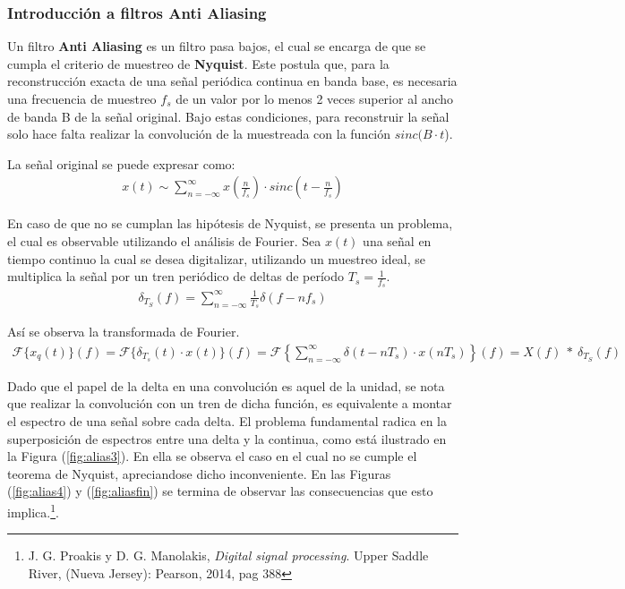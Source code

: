 \subsubsection{Introducción a filtros Anti Aliasing}
Un filtro \textbf{Anti Aliasing} es un filtro pasa bajos, el cual se encarga de que se cumpla el criterio de muestreo de \textbf{Nyquist}. Este postula que, para la reconstrucción exacta de una señal periódica continua en banda base, es necesaria una frecuencia de muestreo $f_s$ de un valor por lo menos 2 veces superior al ancho de banda B de la señal original. Bajo estas condiciones, para reconstruir la señal solo hace falta realizar la convolución de la muestreada con la función $sinc(B\cdot t$).

La señal original se puede expresar como:
\begin{align}
	x\left( t \right) \sim \sum_{n=-\infty}^{\infty} x\left( \frac{n}{f_s} \right) \cdot sinc \left( t-\frac{n}{f_s} \right)
\end{align}

En caso de que no se cumplan las hipótesis de Nyquist, se presenta un problema, el cual es observable utilizando el análisis de Fourier. Sea $x(t)$ una señal en tiempo continuo la cual se desea digitalizar, utilizando un muestreo ideal, se multiplica la señal por un tren periódico de deltas de período $T_s = \frac{1}{f_s}$.
\begin{align}
\delta_{T_S}(f)= \sum_{n=-\infty}^{\infty} \frac{1}{T_s} \delta(f-nf_s)
\end{align}

Así se observa la transformada de Fourier.
\begin{align}
	\mathcal{F} \{x_q(t) \} (f) =\mathcal{F} \{ \delta_{T_s} (t) \cdot x(t) \} (f)=\mathcal{F} \left\lbrace \sum_{n=-\infty}^{\infty} \delta(t-nT_s) \cdot x(nT_s)\right\rbrace (f)= X(f)\  *  \ \delta_{T_S}(f)
\end{align}

Dado que el papel de la delta en una convolución es aquel de la unidad, se nota que realizar la convolución con un tren de dicha función, es equivalente a montar el espectro de una señal sobre cada delta. El problema fundamental radica en la superposición de espectros entre una delta y la continua, como está ilustrado en la Figura (\ref{fig:alias3}). En ella se observa el caso en el cual no se cumple el teorema de Nyquist, apreciandose dicho inconveniente. En las Figuras (\ref{fig:alias4}) y (\ref{fig:aliasfin}) se termina de observar las consecuencias que esto implica.\footnote{J. G. Proakis y D. G. Manolakis, \textit{Digital signal processing}. Upper Saddle River, (Nueva Jersey): Pearson, 2014, pag 388}.

